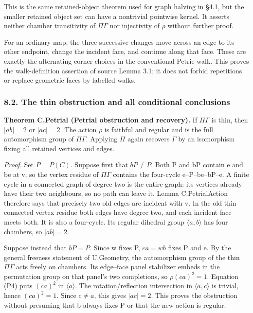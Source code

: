 \documentclass[
  11pt,
  a4paper,
]{article}
\begin{document}
This is the same retained-object theorem used for graph halving in §4.1,
but the smaller retained object set can have a nontrivial pointwise
kernel. It asserts neither chamber transitivity of \(\Pi \Gamma\) nor
injectivity of \(\rho\) without further proof.

For an ordinary map, the three successive changes move across an edge to
its other endpoint, change the incident face, and continue along that
face. These are exactly the alternating corner choices in the
conventional Petrie walk. This proves the walk-definition assertion of
source Lemma 3.1; it does not forbid repetitions or replace geometric
faces by labelled walks.

\subsubsection{8.2. The thin obstruction and all conditional
conclusions}\label{the-thin-obstruction-and-all-conditional-conclusions}

\textbf{Theorem C.Petrial (Petrial obstruction and recovery).} If
\(\Pi \Gamma\) is thin, then \(|ab|=2\) or \(|ac|=2\). The action
\(\rho\) is faithful and regular and is the full automorphism group of
\(\Pi \Gamma\). Applying \(\Pi\) again recovers \(\Gamma\) by an
isomorphism fixing all retained vertices and edges.

\emph{Proof.} Set \(P=P(C)\). Suppose first that \(bP\ne P\). Both P and
bP contain e and be at v, so the vertex residue of \(\Pi \Gamma\)
contains the four-cycle e--P--be--bP--e. A finite cycle in a connected
graph of degree two is the entire graph: its vertices already have their
two neighbours, so no path can leave it. Lemma C.PetrialAction therefore
says that precisely two old edges are incident with v. In the old thin
connected vertex residue both edges have degree two, and each incident
face meets both. It is also a four-cycle. Its regular dihedral group
\(\langle a,b\rangle\) has four chambers, so \(|ab|=2\).

Suppose instead that \(bP=P\). Since w fixes P, \(ca=wb\) fixes P and e.
By the general freeness statement of U.Geometry, the automorphism group
of the thin \(\Pi \Gamma\) acts freely on chambers. Its edge--face panel
stabilizer embeds in the permutation group on that panel's two
completions, so \(\rho (ca)^2=1\). Equation (P4) puts \((ca)^2\) in
\(\langle a\rangle\). The rotation/reflection intersection in
\(\langle a,c\rangle\) is trivial, hence \((ca)^2=1\). Since \(c\ne a\),
this gives \(|ac|=2\). This proves the obstruction without presuming
that b always fixes P or that the new action is regular.
\end{document}
